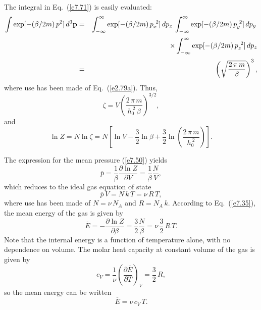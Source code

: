 The integral in Eq.~(\ref{e7.71}) is easily evaluated:
\begin{eqnarray}
\int \exp[-(\beta/2m)\,p^2]\,d^3{\bf p}
&=& \int_{-\infty}^{\infty}\exp[-(\beta/2m)\,p_x^{~2}]\,dp_x\,
\int_{-\infty}^{\infty}\exp[-(\beta/2m)\,p_y^{~2}]\,dp_y\,\nonumber\\[0.5ex]
&&
\times \int_{-\infty}^{\infty}\exp[-(\beta/2m)\,p_z^{~2}]\,dp_z\nonumber\\[0.5ex]
&=& \left(\sqrt{\frac{2\,\pi\,m}{\beta}}\right)^3,
\end{eqnarray}
where use has been made of Eq.~(\ref{e2.79a}). Thus,
\begin{equation}
\zeta = V \left( \frac{2\,\pi\, m}{h_0^{~2}\,\beta}\right)^{3/2},
\end{equation}
and
\begin{equation}
\ln Z = N\ln \zeta = N \left[\ln V - \frac{3}{2}\ln \beta +\frac{3}{2}
\ln\!\left(\frac{2\,\pi\, m}{h_0^{~2}}\right)\right].
\end{equation}


The expression for the mean pressure  (\ref{e7.50}) yields
\begin{equation}
\overline{p} = \frac{1}{\beta}\frac{\partial\ln Z}{\partial V} = \frac{1}{\beta}
\frac{N}{V},
\end{equation}
which reduces to the ideal gas equation of state
\begin{equation}
\overline{p} \,V = N\, k\, T = \nu \,R \,T,
\end{equation}
where use has been made of
$N = \nu \,N_A$ and $R= N_A\, k$. According to Eq.~(\ref{e7.35}), the mean
energy of the gas is given by
\begin{equation}
\overline{E} = - \frac{\partial \ln Z}{\partial \beta} = \frac{3}{2} \frac{N}{\beta}
= \nu\,  \frac{3}{2} \,R\,  T.
\end{equation}
Note that the internal 
energy is a function of temperature alone, with no dependence on
volume. The molar heat capacity at constant volume of the gas is given by
\begin{equation}
c_V = \frac{1}{\nu} \left(\frac{\partial \overline{E}}{\partial T} \right)_V 
= \frac{3}{2}\, R,
\end{equation}
 so the mean energy can be written
\begin{equation}
\overline{E} = \nu\, c_V \,T.
\end{equation}

